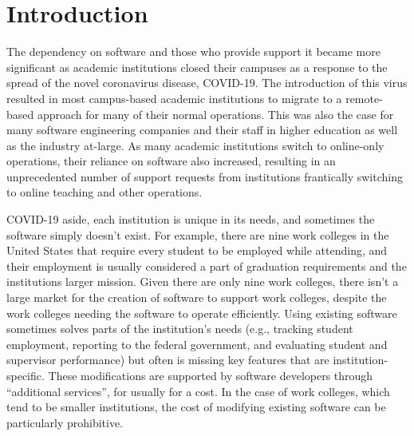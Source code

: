 \section{Introduction}


The dependency on software and those who provide support it became more significant as academic institutions closed their campuses as a response to the spread of the novel coronavirus disease, COVID-19. The introduction of this virus resulted in most campus-based academic institutions to migrate to a remote-based approach for many of their normal operations. This was also the case for many software engineering companies and their staff in higher education as well as the industry at-large. As many academic institutions switch to online-only operations, their reliance on software also increased, resulting in an unprecedented number of support requests from institutions frantically switching to online teaching and other operations.

COVID-19 aside, each institution is unique in its needs, and sometimes the software simply doesn't exist. For example, there are nine work colleges in the United States \cite{WCCMembers, Ecclesia} that require every student to be employed while attending, and their employment is usually considered a part of graduation requirements and the institutions larger mission. Given there are only nine work colleges, there isn't a large market for the creation of software to support work colleges, despite the work colleges needing the software to operate efficiently. Using existing software sometimes solves parts of the institution's needs (e.g., tracking student employment, reporting to the federal government, and evaluating student and supervisor performance) but often is missing key features that are institution-specific. These modifications are supported by software developers through ``additional services”, for usually for a cost. In the case of work colleges, which tend to be smaller institutions, the cost of modifying existing software can be particularly prohibitive.

